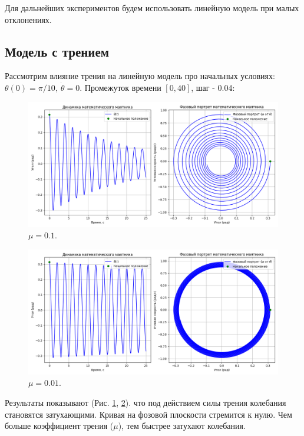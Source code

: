 Для дальнейших экспериментов будем использовать линейную модель при малых отклонениях.

\newpage
\subsection*{Модель с трением}
Рассмотрим влияние трения на линейную модель про начальных условиях: $\theta(0) = \pi /10, \ \dot{\theta} = 0$. Промежуток времени $[0,40]$, шаг - 0.04:
\begin{figure}[h]  %
	\centering
	\includegraphics[width=1\textwidth]{imgs/lin_mu01.png}  %
	\caption{$\mu = 0.1$.}  %
	\label{fig:mu_01}  %
\end{figure}

\begin{figure}[h]  %
	\centering
	\includegraphics[width=1\textwidth]{imgs/lin_mu001.png}  %
	\caption{$\mu = 0.01$.}  %
	\label{fig:mu_001}  %
\end{figure}

Результаты показывают (Рис. \ref{fig:mu_01}, \ref{fig:mu_001}). что под действием силы трения колебания становятся затухающими. Кривая на фозовой плоскости стремится к нулю. Чем больше коэффициент трения ($\mu$), тем быстрее затухают колебания.

